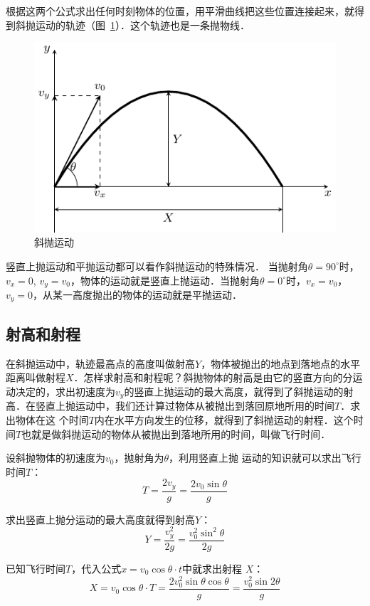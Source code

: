 根据这两个公式求出任何时刻物体的位置，用平滑曲线把这些位置连接起来，就得到斜抛运动的轨迹（图~\ref{fig_A_4-12}）．这个轨迹也是一条抛物线．

\begin{figure}[htbp]
    \centering
    \includegraphics{fig/A/4-12.pdf}
    \caption{斜抛运动}\label{fig_A_4-12}
\end{figure}


竖直上抛运动和平抛运动都可以看作斜抛运动的特殊情况．
当抛射角$\theta=90^{\circ}$时，$v_x=0$, $v_y=v_0$，物体的运动就是竖直上抛运动．当抛射角$\theta =0^{\circ}$时，$v_x=v_0$，$v_y=0$，从某一高度抛出的物体的运动就是平抛运动．

\subsection{射高和射程} 

在斜抛运动中，轨迹最高点的高度叫做射高$Y$，物体被抛出的地点到落地点的水平距离叫做射程$X$．怎样求射高和射程呢？斜抛物体的射高是由它的竖直方向的分运动决定的，求出初速度为$v_y$的竖直上抛运动的最大高度，就得到了斜抛运动的射高．在竖直上抛运动中，我们还计算过物体从被抛出到落回原地所用的时间$T$．求出物体在这
个时间$T$内在水平方向发生的位移，就得到了斜抛运动的射程．这个时间$T$也就是做斜抛运动的物体从被抛出到落地所用的时间，叫做飞行时间．

    设斜抛物体的初速度为$v_0$，抛射角为$\theta$，利用竖直上抛
运动的知识就可以求出飞行时间$T$：
\[T=\frac{2v_y}{g}=\frac{2v_0\sin\theta}{g} \]

求出竖直上抛分运动的最大高度就得到射高$Y$：
\[Y=\frac{v^2_y}{2g}=\frac{v_0^2\sin^2\theta}{2g} \]

已知飞行时间$T$，代入公式$x=v_0\cos\theta \cdot t$中就求出射程
$X$：
\[X=v_0\cos\theta \cdot T=\frac{2v_0^2\sin\theta \cos\theta}{g}=\frac{v_0^2\sin 2\theta}{g} \]

